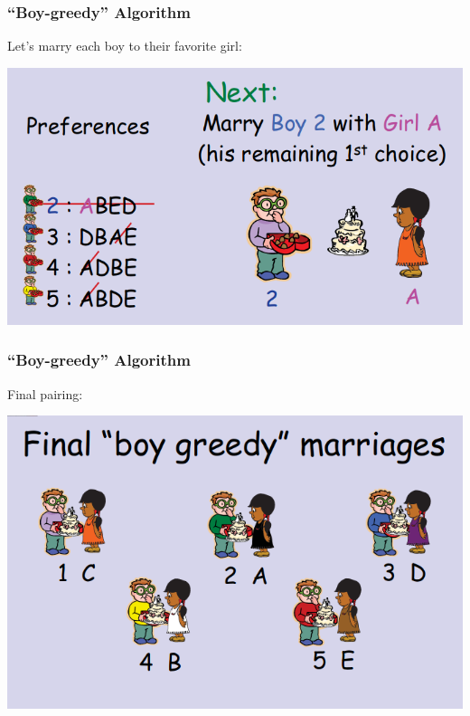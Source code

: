 \documentclass{beamer}
\begin{document}
\begin{frame}
  \frametitle{``Boy-greedy'' Algorithm}

  {\larger
    Let's marry each boy to their favorite girl:
  }
  \begin{center}
    \includegraphics[width=.8\textwidth]{../img/marriage4}
  \end{center}
\end{frame}

\begin{frame}
  \frametitle{``Boy-greedy'' Algorithm}

  {\larger
    Final pairing:
  }
  \begin{center}
    \includegraphics[width=.8\textwidth]{../img/marriage5}
  \end{center}
\end{frame}
\end{document}
